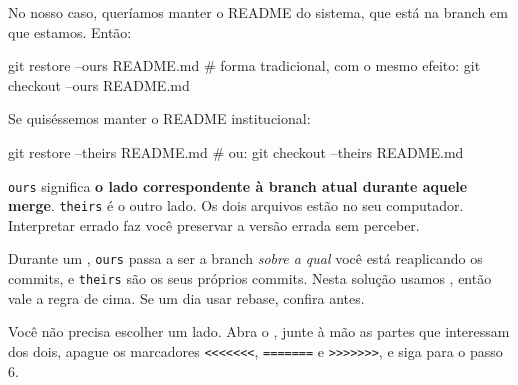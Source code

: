 \begin{center}
\end{center}

No nosso caso, queríamos manter o README do sistema, que está na branch em que estamos. Então:

\begin{terminal}
git restore --ours README.md
# forma tradicional, com o mesmo efeito:
git checkout --ours README.md
\end{terminal}

Se quiséssemos manter o README institucional:

\begin{terminal}
git restore --theirs README.md
# ou: git checkout --theirs README.md
\end{terminal}

\begin{atencao}
\texttt{ours} significa \textbf{o lado correspondente à branch atual durante aquele merge}. \texttt{theirs} é o outro lado. Os dois arquivos estão no seu computador. Interpretar errado faz você preservar a versão errada sem perceber.
\end{atencao}

\begin{atencao}
Durante um , \texttt{ours} passa a ser a branch \emph{sobre a qual} você está reaplicando os commits, e \texttt{theirs} são os seus próprios commits. Nesta solução usamos , então vale a regra de cima. Se um dia usar rebase, confira antes.
\end{atencao}

\begin{dica}
Você não precisa escolher um lado. Abra o , junte à mão as partes que interessam dos dois, apague os marcadores \texttt{<<<<<<<}, \texttt{=======} e \texttt{>>>>>>>}, e siga para o passo 6.
\end{dica}

